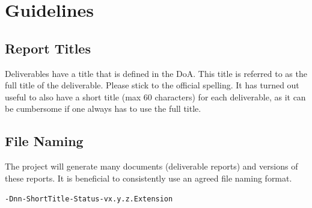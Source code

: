 

\clearpage
\section{Guidelines}
\label{sec:guidelines}


\subsection{Report Titles}
\label{sec:report-titles}

Deliverables have a title that is defined in the \ac{DoA}.
This title is referred to as the full title of the deliverable.
Please stick to the official spelling.
It has turned out useful to also have a short title (max 60 characters) for each deliverable, as it can be cumbersome if one always has to use the full title.

\subsection{File Naming}
\label{sec:file-naming}

The project will generate many documents (deliverable reports) and versions of these reports.
It is beneficial to consistently use an agreed file naming format.

\texttt{\projacronym-Dnn-ShortTitle-Status-vx.y.z.Extension}

